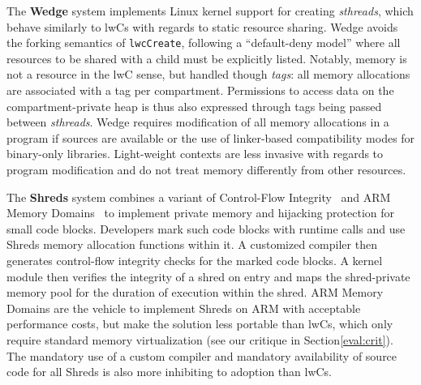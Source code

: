 \documentclass[10pt,twocolumn,a4paper]{article}
\begin{document}

The \textbf{Wedge} system implements Linux kernel support for creating \textit{sthreads}, which behave similarly to lwCs with regards to static resource sharing.
Wedge avoids the forking semantics of \lstinline{lwcCreate}, following a \enquote{default-deny model} where all resources to be shared with a child must be explicitly listed.
Notably, memory is not a resource in the lwC sense, but handled though \textit{tags}: all memory allocations are associated with a tag per compartment.
Permissions to access data on the compartment-private heap is thus also expressed through tags being passed between \textit{sthreads}.
Wedge requires modification of all memory allocations in a program if sources are available or the use of linker-based compatibility modes for binary-only libraries.
Light-weight contexts are less invasive with regards to program modification and do not treat memory differently from other resources.
\cite{bittau2008wedge}

The \textbf{Shreds} system combines a variant of Control-Flow Integrity~\cite{abadi2009control} and ARM Memory Domains~\cite{armmemorydomains} to implement private memory and hijacking protection for small code blocks.
Developers mark such code blocks with runtime calls and use Shreds memory allocation functions within it.
A customized compiler then generates control-flow integrity checks for the marked code blocks.
A kernel module then verifies the integrity of a shred on entry and maps the shred-private memory pool for the duration of execution within the shred.
ARM Memory Domains are the vehicle to implement Shreds on ARM with acceptable performance costs, but make the solution less portable than lwCs, which only require standard memory virtualization (see our critique in Section\ref{eval:crit}).
The mandatory use of a custom compiler and mandatory availability of source code for all Shreds is also more inhibiting to adoption than lwCs.
\cite{chen2016shreds}

  
  
\end{document}
